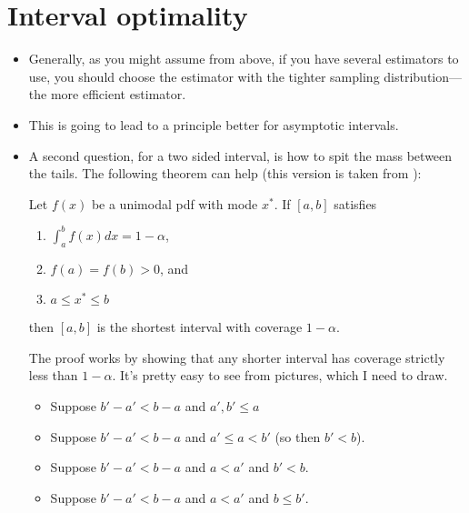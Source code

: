 \section{Interval optimality}

\begin{itemize}[leftmargin=0pt]

\item Generally, as you might assume from above, if you have several
  estimators to use, you should choose the estimator with the tighter
  sampling distribution---the more efficient estimator.

\item This is going to lead to a principle better for asymptotic
  intervals.

\item A second question, for a two sided interval, is how to spit the
  mass between the tails.  The following theorem can help (this
  version is taken from \citealp{CB02}):

  \begin{thm}
    Let $f(x)$ be a unimodal pdf with mode $x^*$.  If $[a,b]$
    satisfies
    \begin{enumerate}
    \item $\int_a^b f(x) dx = 1 - \alpha$,
    \item $f(a) = f(b) > 0$, and
    \item $a \leq x^* \leq b$
    \end{enumerate}
    then $[a,b]$ is the shortest interval with coverage $1-\alpha$.
  \end{thm}

  The proof works by showing that any shorter interval has coverage
  strictly less than $1-\alpha$.  It's pretty easy to see from pictures,
  which I need to draw.

  \begin{itemize}
  \item Suppose $b'-a' < b-a$ and $a', b' \leq a$
  \item Suppose $b'-a' < b-a$ and $a' \leq a < b'$ (so then $b' < b$).
  \item Suppose $b'-a' < b-a$ and $a < a'$ and $b' < b$.
  \item Suppose $b'-a' < b-a$ and $a < a'$ and $b \leq b'$.
  \end{itemize}

\end{itemize}

